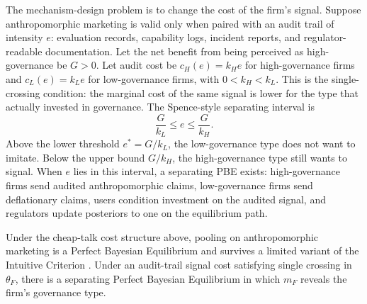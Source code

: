 The mechanism-design problem is to change the cost of the firm's signal. Suppose
anthropomorphic marketing is valid only when paired with an audit trail of
intensity $e$: evaluation records, capability logs, incident reports, and
regulator-readable documentation. Let the net benefit from being perceived as
high-governance be $G>0$. Let audit cost be $c_H(e)=k_H e$ for high-governance
firms and $c_L(e)=k_L e$ for low-governance firms, with
$0<k_H<k_L$. This is the single-crossing condition: the marginal cost of the
same signal is lower for the type that actually invested in governance. The
Spence-style separating interval is
\[
\frac{G}{k_L} \leq e \leq \frac{G}{k_H}.
\]
Above the lower threshold $e^\ast=G/k_L$, the low-governance type does not want
to imitate. Below the upper bound $G/k_H$, the high-governance type still wants
to signal. When $e$ lies in this interval, a separating PBE exists:
high-governance firms send audited anthropomorphic claims, low-governance firms send
deflationary claims, users condition investment on the audited signal, and
regulators update posteriors to one on the equilibrium path.

\begin{proposition}
\label{prop:cheap-talk-separation}
Under the cheap-talk cost structure above, pooling on anthropomorphic marketing
is a Perfect Bayesian Equilibrium and survives a limited variant of the Intuitive Criterion \citep{cho_kreps1987}. Under
an audit-trail signal cost satisfying single crossing in $\theta_F$, there is a
separating Perfect Bayesian Equilibrium in which $m_F$ reveals the firm's
governance type.
\end{proposition}

